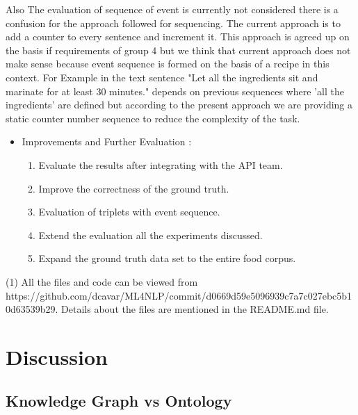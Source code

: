 \documentclass[11pt,letterpaper]{article}
\begin{document}
Also The evaluation of sequence of event is currently not considered there is a confusion for the approach followed for sequencing. The current approach is to add a counter to every sentence and increment it. This approach is agreed up on the basis if requirements of group 4 but we think that current approach does not make sense because event  sequence is formed on the basis of a recipe in this context.
\newline
For Example in the text sentence "Let all the ingredients sit and marinate for at least 30 minutes." depends on previous sequences where 'all the ingredients' are defined but according to the present approach we are providing a static counter number sequence to reduce the complexity of the task.
\newline
\newpage
\begin{itemize}
    \item Improvements and Further Evaluation :
    \begin{enumerate}
        \item Evaluate the results after integrating with the API team.
        \item Improve the correctness of the ground truth.
        \item Evaluation of triplets with event sequence.
        \item Extend the evaluation all the experiments discussed.
        \item Expand the ground truth data set to the entire food corpus.
    \end{enumerate}
\end{itemize}

\noindent (1) All the files and code can be viewed from\newline
https://github.com/dcavar/ML4NLP/commit/d0669d59e5096939c7a7c027ebc5b10d63539b29. 
Details about the files are mentioned in the README.md file.

\section{Discussion}

\subsection{Knowledge Graph vs Ontology}\label{ont_vs_kg}
\end{document}
